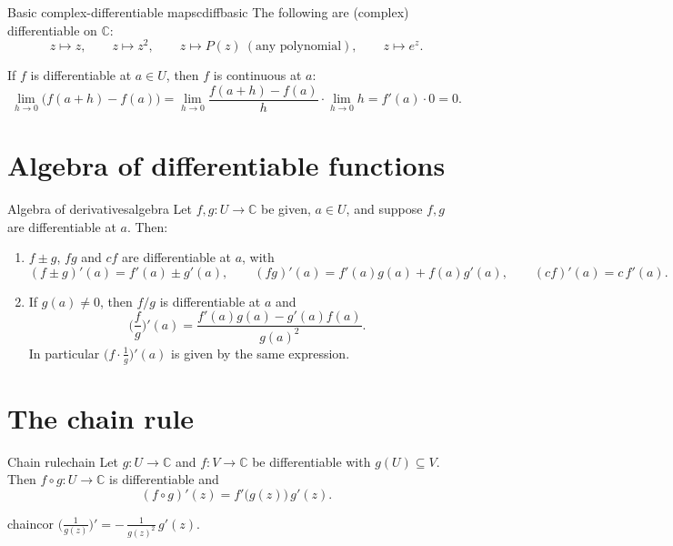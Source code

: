 \documentclass[11pt,openany]{report}
\newcommand{\C}{\mathbb{C}}
\begin{document}
\begin{example}{Basic complex-differentiable maps}{cdiffbasic}
The following are (complex) differentiable on $\C$:
\[
  z\mapsto z, \qquad z\mapsto z^2, \qquad z\mapsto P(z)\ (\text{any polynomial}),
  \qquad z\mapsto e^{z}.
\]
\end{example}

\begin{remark}
If $f$ is differentiable at $a\in U$, then $f$ is continuous at $a$:
\[
  \lim_{h\to0}\bigl(f(a+h)-f(a)\bigr)
  = \lim_{h\to0}\frac{f(a+h)-f(a)}{h}\cdot \lim_{h\to0} h
  = f'(a)\cdot 0 = 0.
\]
\end{remark}

\section{Algebra of differentiable functions}

\begin{propos}{Algebra of derivatives}{algebra}
Let $f,g:U\to\C$ be given, $a\in U$, and suppose $f,g$ are differentiable at $a$. Then:
\begin{enumerate}[label=\textup{(\arabic*)},leftmargin=2em]
  \item $f\pm g$, $fg$ and $cf$ are differentiable at $a$, with
  \[
    (f\pm g)'(a) = f'(a)\pm g'(a),\qquad
    (fg)'(a) = f'(a)g(a)+f(a)g'(a),\qquad
    (cf)'(a) = c\,f'(a).
  \]
  \item If $g(a)\ne0$, then $f/g$ is differentiable at $a$ and
  \[
    \Big(\frac{f}{g}\Big)'(a) = \frac{f'(a)g(a) - g'(a)f(a)}{g(a)^2}.
  \]
  In particular $\Big(f\cdot\frac1g\Big)'(a)$ is given by the same expression.
\end{enumerate}
\end{propos}

\section{The chain rule}

\begin{theorem}{Chain rule}{chain}
Let $g:U\to\C$ and $f:V\to\C$ be differentiable with $g(U)\subseteq V$. Then
$f\circ g:U\to\C$ is differentiable and
\[
  (f\circ g)'(z) = f'\!\bigl(g(z)\bigr)\,g'(z).
\]
\end{theorem}

\begin{corollary}{}{chaincor}
$\displaystyle \Big(\frac{1}{g(z)}\Big)' = -\,\frac{1}{g(z)^2}\,g'(z).$
\end{corollary}
\end{document}
